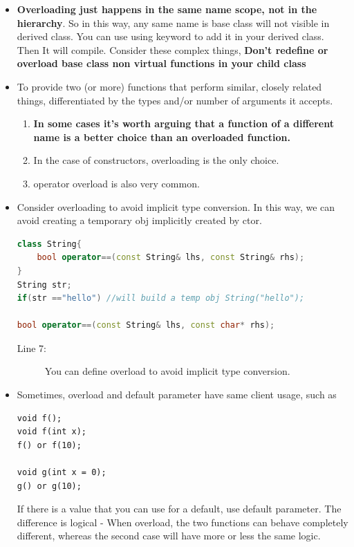 \documentclass[a4paper,11pt,twoside]{book}
\begin{document}
\begin{itemize}
	
	\item  \textbf{Overloading just happens in the same name scope, not in the hierarchy}. So in this way, any same name is base class will not  visible in derived class. You can use using keyword to add it in your derived class. Then It will compile. Consider these complex things, \textbf{Don't redefine or overload base class non virtual functions in your child class}
	
	\item To provide two (or more) functions that perform similar, closely related things, differentiated by the types and/or number of arguments it accepts.
	
	\begin{enumerate}
		\item \textbf{In some cases it's worth arguing that a function of a different name is a better choice than an overloaded function.}
		
		\item  In the case of constructors, overloading is the only choice.
		
		\item  operator overload is also very common.
	\end{enumerate}
	
	\item Consider overloading to avoid implicit type conversion. In this way, we can avoid creating a temporary obj implicitly created by ctor.
	
\begin{lstlisting}[frame=single, language=c++]
class String{
	bool operator==(const String& lhs, const String& rhs);
}
String str;
if(str =="hello") //will build a temp obj String("hello");
	
bool operator==(const String& lhs, const char* rhs);
\end{lstlisting}
\begin{description}
	\item[Line 7:] You can define overload to avoid implicit type conversion.
\end{description}
	
	\item Sometimes, overload and default parameter have same client usage, such as
\begin{lstlisting}[numbers=none]
void f();
void f(int x);
f() or f(10);
	
void g(int x = 0);
g() or g(10);
\end{lstlisting}
	
	If there is a value that you can use for a default, use default parameter. The difference is logical - When overload, the two functions can behave completely different, whereas the second case will have more or less the same logic.
	
\end{itemize}
\end{document}
